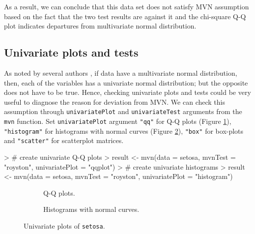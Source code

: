 \documentclass[11pt]{article}
\begin{document}
As a result, we can conclude that this data set does not satisfy MVN assumption based on the fact that the two test results are against it and the chi-square Q-Q plot indicates departures from multivariate normal distribution.

\subsection{Univariate plots and tests}

As noted by several authors \cite{burdenski2000, stevens2012applied, kass2014}, if data have a multivariate normal distribution, then, each of the variables has a univariate normal distribution; but the opposite does not have to be true. Hence, checking univariate plots and tests could be very useful to diagnose the reason for deviation from MVN. We can check this assumption through \texttt{univariatePlot} and \texttt{univariateTest} arguments from the \texttt{mvn} function. Set \texttt{univariatePlot} argument  \texttt{"qq"} for Q-Q plots (Figure \ref{subfig:UniQQ}), \texttt{"histogram"} for histograms with normal curves (Figure \ref{subfig:UniHist}), \texttt{"box"} for box-plots and \texttt{"scatter"} for scatterplot matrices.


\begin{Schunk}
\begin{Sinput}
> # create univariate Q-Q plots
> result <- mvn(data = setosa, mvnTest = "royston", univariatePlot = "qqplot")
> # create univariate histograms
> result <- mvn(data = setosa, mvnTest = "royston", univariatePlot = "histogram")
\end{Sinput}
\end{Schunk}

\begin{figure}[htb]
\centering
	\begin{subfigure}[b]{0.485\textwidth}
\centering
\scalebox{0.90}{
}
		\caption{Q-Q plots.}
		\label{subfig:UniQQ}
	\end{subfigure}%
	\quad 	%
	\begin{subfigure}[b]{0.485\textwidth}
\centering
\scalebox{0.90}{
}
		\caption{Histograms with normal curves.}
		\label{subfig:UniHist}
	\end{subfigure}
\caption{Univariate plots of \texttt{setosa}.} \label{fig:uniQQHist}
\end{figure}
\end{document}
